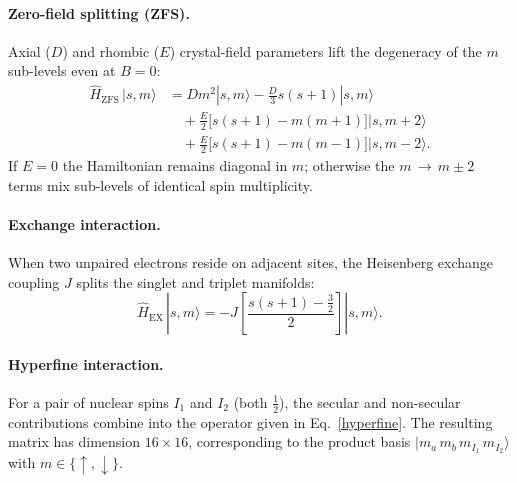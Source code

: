 \documentclass[svgnames]{article}
\begin{document}
\paragraph{Zero\hyp{}field splitting (ZFS).} Axial ($D$) and rhombic ($E$) \mbox{crystal\hyp{}field} parameters lift the degeneracy of the $m$\,\textendash{}sub\hyp{}levels even at $B=0$:
\begin{align}
 \hat{H}_{\mathrm{ZFS}}\,|s,m\rangle &= D m^2 |s,m\rangle - \frac{D}{3}s(s+1)|s,m\rangle\\[3pt]
 &\quad+\frac{E}{2}\bigl[s(s+1)-m(m+1)\bigr]|s,m+2\rangle\\[3pt]
 &\quad+\frac{E}{2}\bigl[s(s+1)-m(m-1)\bigr]|s,m-2\rangle.
\end{align}
If $E=0$ the Hamiltonian remains diagonal in $m$; otherwise the $m\,\to\,m\pm2$ terms mix sub\hyp{}levels of identical spin multiplicity.

\paragraph{Exchange interaction.} When two unpaired electrons reside on adjacent sites, the Heisenberg exchange coupling $J$ splits the singlet and triplet manifolds:
\[
  \hat{H}_{\mathrm{EX}}\,|s,m\rangle = -J\left[\frac{s(s+1)-\tfrac{3}{2}}{2}\right] |s,m\rangle.
\]

\paragraph{Hyperfine interaction.} For a pair of nuclear spins $I_1$ and $I_2$
(both $\tfrac12$), the secular and \mbox{non\hyp{}secular} contributions combine
into the operator given in Eq.~\eqref{hyperfine}. The resulting matrix has
dimension $16\times16$, corresponding to the product basis
$|m_a\,m_b\,m_{I_1}\,m_{I_2}\rangle$ with $m\in\{\uparrow,\downarrow\}$.
\end{document}
